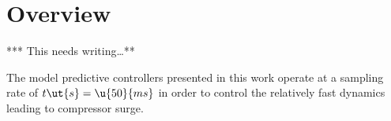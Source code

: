 \section{Overview}

*** This needs writing\ldots ***

The model predictive controllers presented in this work operate at a sampling rate of $t\ut{s} = \u{50}{ms}$ in order to control the relatively fast dynamics leading to compressor surge.








